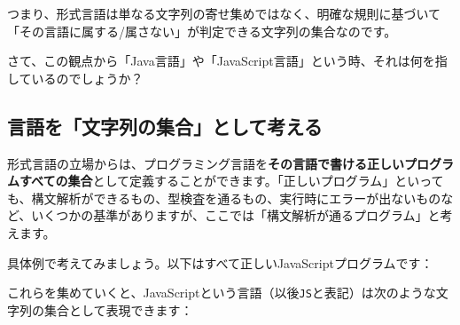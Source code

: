 つまり、形式言語は単なる文字列の寄せ集めではなく、明確な規則に基づいて「その言語に属する/属さない」が判定できる文字列の集合なのです。

さて、この観点から「Java言語」や「JavaScript言語」という時、それは何を指しているのでしょうか？

\hypertarget{chapter4-ux8a00ux8a9eux3092ux6587ux5b57ux5217ux306eux96c6ux5408ux3068ux3057ux3066ux8003ux3048ux308b}{%
\subsection{言語を「文字列の集合」として考える}\label{chapter4-ux8a00ux8a9eux3092ux6587ux5b57ux5217ux306eux96c6ux5408ux3068ux3057ux3066ux8003ux3048ux308b}}

形式言語の立場からは、プログラミング言語を\textbf{その言語で書ける正しいプログラムすべての集合}として定義することができます。「正しいプログラム」といっても、構文解析ができるもの、型検査を通るもの、実行時にエラーが出ないものなど、いくつかの基準がありますが、ここでは「構文解析が通るプログラム」と考えます。

具体例で考えてみましょう。以下はすべて正しいJavaScriptプログラムです：

\begin{Shaded}
\begin{Highlighting}[]
\NormalTok{(}\NormalTok{)}\OperatorTok{;}
\end{Highlighting}
\end{Shaded}

\begin{Shaded}
\begin{Highlighting}[]
\NormalTok{(}\NormalTok{)}\OperatorTok{;}
\end{Highlighting}
\end{Shaded}

\begin{Shaded}
\begin{Highlighting}[]
\NormalTok{(} \OperatorTok{+} \NormalTok{)}\OperatorTok{;}
\end{Highlighting}
\end{Shaded}

これらを集めていくと、JavaScriptという言語（以後\texttt{JS}と表記）は次のような文字列の集合として表現できます：

\begin{Shaded}
\begin{Highlighting}[]
\NormalTok{\}}
\end{Highlighting}
\end{Shaded}


